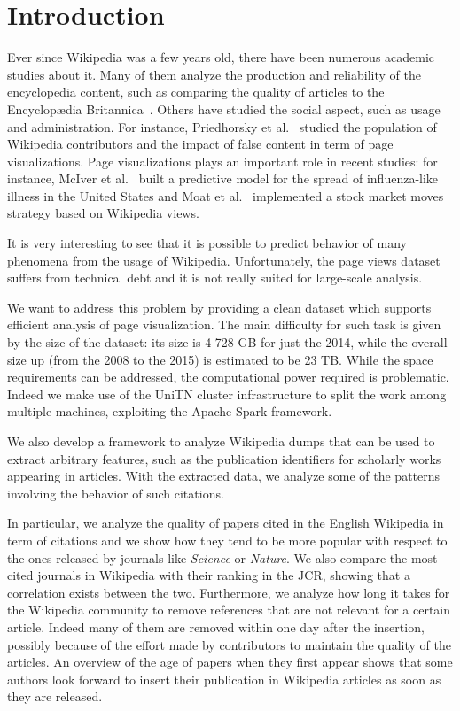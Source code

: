 
\chapter*{Introduction} %
\label{introduction}
Ever since Wikipedia was a few years old, there have been numerous academic studies about it.
Many of them analyze the production and reliability of the encyclopedia content, such as comparing the quality of articles to the Encyclopædia Britannica~\cite{Giles2005}.
Others have studied the social aspect, such as usage and administration.
For instance, Priedhorsky et al.~\cite{Priedhorsky2007} studied the population of Wikipedia contributors and the impact of false content in term of page visualizations.
Page visualizations plays an important role in recent studies:
for instance, McIver et al.~\cite{McIver2014} built a predictive model for the spread of influenza-like illness in the United States and Moat et al.~\cite{Moat2013} implemented a stock market moves strategy based on Wikipedia views.

It is very interesting to see that it is possible to predict behavior of many phenomena from the usage of Wikipedia.
Unfortunately, the page views dataset suffers from technical debt and it is not really suited for large-scale analysis.

We want to address this problem by providing a clean dataset which supports efficient analysis of page visualization.
The main difficulty for such task is given by the size of the dataset: its size is 4 728 GB for just the 2014, while the overall size up (from the 2008 to the 2015) is estimated to be 23 TB.
While the space requirements can be addressed, the computational power required is problematic.
Indeed we make use of the UniTN cluster infrastructure to split the work among multiple machines, exploiting the Apache Spark framework.

We also develop a framework to analyze Wikipedia dumps that can be used to extract arbitrary features, such as the publication identifiers for scholarly works appearing in articles.
With the extracted data, we analyze some of the patterns involving the behavior of such citations.

In particular, we analyze the quality of papers cited in the English Wikipedia in term of citations and we show how they tend to be more popular with respect to the ones released by journals like \emph{Science} or \emph{Nature}.
We also compare the most cited journals in Wikipedia with their ranking in the \ac{JCR}, showing that a correlation exists between the two.
Furthermore, we analyze how long it takes for the Wikipedia community to remove references that are not relevant for a certain article.
Indeed many of them are removed within one day after the insertion, possibly because of the effort made by contributors to maintain the quality of the articles.
An overview of the age of papers when they first appear shows that some authors look forward to insert their publication in Wikipedia articles as soon as they are released.


